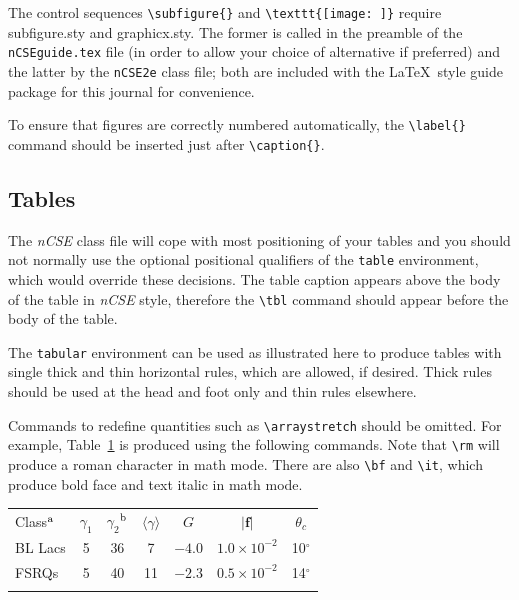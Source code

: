 \documentclass{nCSE2e}
\begin{document}
The control sequences \verb"\subfigure{}" and \verb"\texttt{[image: ]}" require subfigure.sty and graphicx.sty.
The former is called in the preamble of the \texttt{nCSEguide.tex} file (in order to allow your choice of alternative if preferred)
and the latter by the \texttt{nCSE2e} class file; both are included with the \LaTeX\ style guide package for this journal for convenience.

To ensure that figures are correctly numbered automatically, the \verb"\label{}" command should be inserted just
after \verb"\caption{}".


\subsection{Tables}

The {\it nCSE} class file will cope with most positioning of your tables and you should not normally use the optional
positional qualifiers of the {\tt table} environment, which would override these decisions. The table caption
appears above the body of the table in {\it nCSE} style, therefore the \verb"\tbl" command should appear before
the body of the table.

The {\tt tabular} environment can be used as illustrated here to produce tables with single thick and thin horizontal rules, which
are allowed, if desired. Thick rules should be used at the head and foot only and thin rules elsewhere.

Commands to redefine quantities such as \verb"\arraystretch" should be omitted. For example, Table~\ref{symbols}
is produced using the following commands. Note that \verb"\rm" will produce a roman character in math mode. There
are also \verb"\bf" and \verb"\it", which produce bold face and text italic in math mode.

\begin{table}
{\begin{tabular}[l]{@{}lcccccc}\toprule
  Class$^{\rm a}$ & $\gamma _1$ & $\gamma _2$$^{\rm b}$
         & $\langle \gamma \rangle$
         & $G$ & $|{\bm f}|$ & $\theta _{c}$ \\
\colrule
  BL Lacs &5 & 36 & 7 & $-4.0$ & $1.0\times 10^{-2}$ & 10$^\circ$ \\
  FSRQs & 5 & 40 & 11 & $-2.3$ & $0.5\times 10^{-2}$ & 14$^\circ$ \\
\botrule
\end{tabular}}
\label{symbols}
\end{table}
\end{document}
